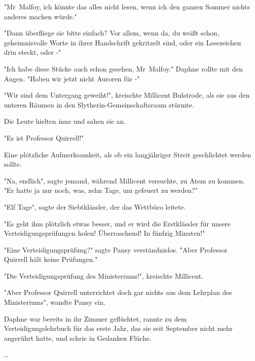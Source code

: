 {"Mr~Malfoy, ich könnte das alles nicht lesen, wenn ich den ganzen Sommer nichts anderes machen würde."

"Dann überfliege sie bitte einfach? Vor allem, wenn da, du weißt schon, geheimnisvolle Worte in ihrer Handschrift gekritzelt sind, oder ein Lesezeichen drin steckt, oder -"

"Ich habe diese Stücke auch schon gesehen, Mr~Malfoy." Daphne rollte mit den Augen. "Haben wir jetzt nicht Auroren für -"

"Wir sind dem Untergang geweiht!", kreischte Millicent Bulstrode, als sie aus den unteren Räumen in den Slytherin-Gemeinschaftsraum stürmte.

Die Leute hielten inne und sahen sie an.

"Es ist Professor Quirrell!"

Eine plötzliche Aufmerksamkeit, als ob ein langjähriger Streit geschlichtet werden sollte.

"Na, endlich", sagte jemand, während Millicent versuchte, zu Atem zu kommen. "Er hatte ja nur noch, was, zehn Tage, um gefeuert zu werden?"

"Elf Tage", sagte der Siebtklässler, der das Wettbüro leitete.

"Es geht ihm plötzlich etwas besser, und er wird die Erstklässler für unsere Verteidigungsprüfungen holen! Überraschend! In fünfzig Minuten!"

"Eine Verteidigungsprüfung?" sagte Pansy verständnislos. "Aber Professor Quirrell hält keine Prüfungen."

"Die Verteidigungsprüfung des Ministeriums!", kreischte Millicent.

"Aber Professor Quirrell unterrichtet doch gar nichts aus dem Lehrplan des Ministeriums", wandte Pansy ein.

Daphne war bereits in ihr Zimmer geflüchtet, rannte zu dem Verteidigungslehrbuch für das erste Jahr, das sie seit September nicht mehr angerührt hatte, und schrie in Gedanken Flüche.

…

}
